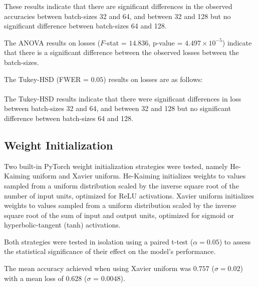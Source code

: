 These results indicate that there are significant differences in the observed accuracies between batch-sizes 32 and 64, and between 32 and 128 but no significant difference
between batch-sizes 64 and 128.

The ANOVA results on losses ($F$-stat = $14.836$, p-value = $4.497 \times 10^{-5}$)
indicate that there is a significant difference between the observed losses between the batch-sizes.

The Tukey-HSD (FWER = $0.05$) results on losses are as follows: \\

\noindent
{} \\

The Tukey-HSD results indicate that there were significant differences in loss between batch-sizes 32 and 64, and between 32 and 128 but no significant difference
between batch-sizes 64 and 128.

\subsection{Weight Initialization}

Two built-in PyTorch weight initialization strategies were tested, namely He-Kaiming uniform 
and Xavier uniform. He-Kaiming initializes weights to values sampled from a uniform distribution 
scaled by the inverse square root of the number of input units, optimized for ReLU activations. 
Xavier uniform initializes weights to values sampled from a uniform distribution scaled by the 
inverse square root of the sum of input and output units, optimized for sigmoid or hyperbolic-tangent (tanh) activations.

Both strategies were tested in isolation using a paired t-test ($\alpha = 0.05$) to assess the statistical significance of their effect on the
model's performance.

The mean accuracy achieved when using Xavier uniform was $0.757$ ($\sigma = 0.02$) with a mean loss of $0.628$ ($\sigma$ = $0.0048$). 

